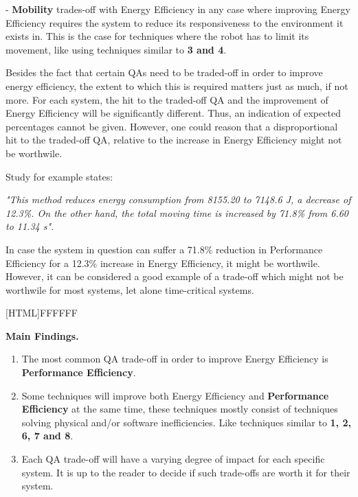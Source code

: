 \vspace{2mm}

- \textbf{Mobility} trades-off with Energy Efficiency in any case where improving Energy Efficiency requires the system to reduce its responsiveness to 
the environment it exists in. This is the case for techniques where the robot has to limit its movement, like using techniques similar to \textbf{3 and 4}.

\vspace{2mm}

Besides the fact that certain QAs need to be traded-off in order to improve energy efficiency, the extent to which this is required 
matters just as much, if not more.
For each system, the hit to the traded-off QA and the improvement of Energy Efficiency will be significantly different.
Thus, an indication of expected percentages cannot be given.
However, one could reason that a disproportional hit to the traded-off QA, relative to the increase in Energy Efficiency might not be worthwile.

\vspace{2mm}

Study \cite{kaitwanidvilai2020industrial_robot_cycle_time} for example states: 

\noindent\textit{"This method reduces energy consumption from 8155.20 to 7148.6 J, 
a decrease of 12.3\%. On the other hand, the total moving time is increased by 71.8\% from 6.60 to 11.34 s".}

\vspace{2mm}

In case the system in question can suffer a 71.8\% reduction in Performance Efficiency for a 12.3\% increase in Energy Efficiency, it might be worthwile.
However, it can be considered a good example of a trade-off which might not be worthwile for most systems, let alone time-critical systems.

\vspace{5mm}

\noindent{}[HTML]{FFFFFF}{\parbox{0.47\textwidth}{%
\noindent \textbf{Main Findings.}
\begin{enumerate}[nolistsep]
\item The most common QA trade-off in order to improve Energy Efficiency is \textbf{Performance Efficiency}.
\item Some techniques will improve both Energy Efficiency and \textbf{Performance Efficiency} at the same time, 
these techniques mostly consist of techniques solving physical and/or software inefficiencies.
Like techniques similar to \textbf{1, 2, 6, 7 and 8}.
\item Each QA trade-off will have a varying degree of impact for each specific system. 
It is up to the reader to decide if such trade-offs are worth it for their system.
\end{enumerate}}}
